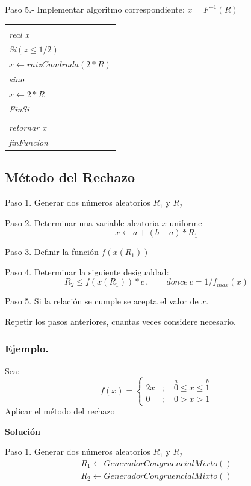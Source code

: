 \documentclass[11pt,letterpaper]{report}
\newenvironment{algoritmo}
  {\begin{center}\begin{tabular}{|p{0.85\textwidth}|}\hline\vspace{-0.2cm}\begin{tabbing}\hspace{0.6cm}\=\hspace{0.6cm}\=\hspace{0.6cm}\=\hspace{0.6cm}\=\hspace{0.6cm}\=\kill}
  {\end{tabbing}\vspace{-0.4cm}\\\hline\end{tabular}\end{center}}
\begin{document}
Paso 5.- Implementar algoritmo correspondiente: $x = F^{-1}(R)$

\begin{algoritmo}
\textit{real funcion variableEmpirica(real R)}\\
\>\textit{real x}\\
\>\textit{Si}$(z \leq 1/2)$\footnotemark\\
\>\>$x \longleftarrow raizCuadrada(2 * R)$\\
\>\textit{sino}\\
\>\>$x \longleftarrow 2 * R$\\
\>\textit{FinSi}\\
\\
\>\textit{retornar x}\\
\textit{finFuncion}
\end{algoritmo}

\subsection*{Método del Rechazo}

Paso 1. Generar dos números aleatorios $R_1$ y $R_2$

Paso 2. Determinar una variable aleatoria $x$ uniforme
\[
x \leftarrow a + (b - a) * R_1
\]

Paso 3. Definir la función $f(x(R_1))$

Paso 4. Determinar la siguiente desigualdad:
\[
R_2 \leq f(x(R_1)) * c\,,\qquad donce\ c = 1/f_{max}(x)
\]

Paso 5. Si la relación se cumple se acepta el valor de $x$.

\qquad Repetir los pasos anteriores, cuantas veces considere necesario.

\subsubsection*{Ejemplo.}

Sea:
\[
f(x) = \begin{cases}
2x & ;\quad \overset{a}{0} \leq x \leq \overset{b}{1}\\
0 & ;\quad 0 > x > 1
\end{cases}
\]
Aplicar el método del rechazo

\textbf{Solución}

Paso 1. Generar dos números aleatorios $R_1$ y $R_2$
\begin{gather*}
R_1 \leftarrow GeneradorCongruencialMixto()\\
R_2 \leftarrow GeneradorCongruencialMixto()
\end{gather*}
\end{document}
